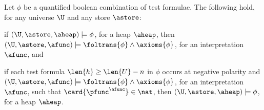 \begin{lemma}\label{lemma:test-fo-sat}
  Let $\phi$ be a quantified boolean combination of test formulae.
  The following hold, for any universe $\U$ and any store
  $\astore$: \begin{compactenum}
    \item\label{it:test-fo-sat1} if $(\U,\astore,\aheap) \models
      \phi$, for a heap $\aheap$, then $(\U,\astore,\afunc) \models
      \foltrans{\phi} \wedge \axioms{\phi}$, for an interpretation
      $\afunc$, and
    \item\label{it:test-fo-sat2} if each test formula $\len{h} \geq
      \len{U} - n$ in $\phi$ occurs at negative polarity and
      $(\U,\astore,\afunc) \models \foltrans{\phi} \wedge
      \axioms{\phi}$, for an interpretation $\afunc$, such that
      $\card{\pfunc^\afunc} \in \nat$, then $(\U,\astore,\aheap)
      \models \phi$, for a heap $\aheap$.
  \end{compactenum}
\end{lemma}
